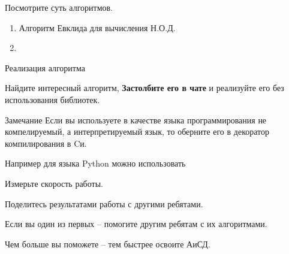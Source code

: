 \begin{frame}
	Посмотрите суть алгоритмов.
	
	\begin{enumerate}
		\item Алгоритм Евклида для вычисления Н.О.Д.
		\item %
	\end{enumerate}
\end{frame}


\begin{frame}{Реализация алгоритма}
	
	Найдите интересный алгоритм, 	\textbf{Застолбите его в чате} и реализуйте его без использования библиотек.
	
	\begin{block}{Замечание}
		Если вы используете в качестве языка программирования не компелируемый, а интерпретируемый язык,
		то оберните его в декоратор компилирования в Cи.
		
		Например для языка Python можно использовать 
	\end{block}
	
	Измерьте скорость работы.
	
	Поделитесь результатами работы с другими ребятами.
	
	Если вы один из первых -- помогите другим ребятам с их алгоритмами.
	
	Чем больше вы поможете -- тем быстрее освоите АиСД.
	
	
\end{frame}


